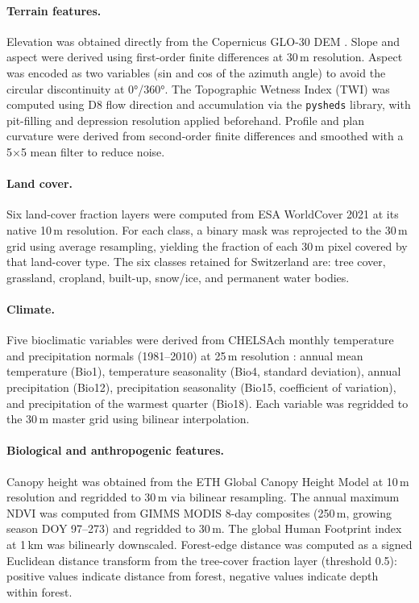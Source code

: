 \paragraph{Terrain features.}
Elevation was obtained directly from the Copernicus GLO-30 DEM \citep{CopernicusDEM}. 
Slope and aspect were derived using first-order finite differences at 30\,m 
resolution. Aspect was encoded as two variables (sin and cos of the azimuth angle) 
to avoid the circular discontinuity at 0°/360°. The Topographic Wetness Index (TWI) 
was computed using D8 flow direction and accumulation via the \texttt{pysheds} 
library, with pit-filling and depression resolution applied beforehand. Profile 
and plan curvature were derived from second-order finite differences and smoothed 
with a 5$\times$5 mean filter to reduce noise.

\paragraph{Land cover.}
Six land-cover fraction layers were computed from ESA WorldCover 2021 
\citep{ESAWorldcover} at its native 10\,m resolution. For each class, a binary mask 
was reprojected to the 30\,m grid using average resampling, yielding the fraction 
of each 30\,m pixel covered by that land-cover type. The six classes retained 
for Switzerland are: tree cover, grassland, cropland, built-up, snow/ice, and 
permanent water bodies.

\paragraph{Climate.}
Five bioclimatic variables were derived from CHELSAch monthly temperature and 
precipitation normals (1981--2010) at 25\,m resolution \citep{CHELSAch}: 
annual mean temperature (Bio1), temperature seasonality (Bio4, standard deviation), 
annual precipitation (Bio12), precipitation seasonality (Bio15, coefficient of variation), and precipitation of the warmest quarter (Bio18). Each variable was regridded to the 30\,m master grid using bilinear interpolation.

\paragraph{Biological and anthropogenic features.}
Canopy height was obtained from the ETH Global Canopy Height Model at 10\,m 
resolution \citep{Lang2023} and regridded to 30\,m via bilinear resampling. 
The annual maximum NDVI was computed from GIMMS MODIS 8-day composites (250\,m, 
growing season DOY 97--273) and regridded to 30\,m. The global Human Footprint 
index \citep{Mu2022} at 1\,km was bilinearly downscaled. Forest-edge distance was 
computed as a signed Euclidean distance transform from the tree-cover fraction 
layer (threshold 0.5): positive values indicate distance from forest, negative 
values indicate depth within forest.

